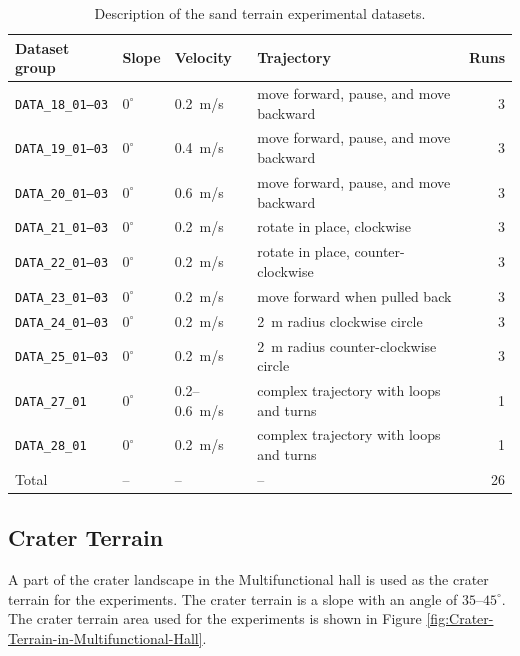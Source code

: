 \documentclass[report.tex]{subfiles}
\begin{document}
    \begin{table}[htbp]
        \centering
        \caption{Description of the sand terrain experimental datasets.}
        \label{tab:sand-terrain-experiments}
        \small
        \setlength{\tabcolsep}{3pt}
        \begin{tabular}{@{}p{}p{}p{}p{}r@{}}
            \toprule
            Dataset group & Slope & Velocity & Trajectory & Runs \\
            \midrule
            \texttt{DATA\_18\_01--03} & $0^\circ$ & 0.2~m/s & move forward, pause, and move backward & 3 \\
            \texttt{DATA\_19\_01--03} & $0^\circ$ & 0.4~m/s & move forward, pause, and move backward & 3 \\
            \texttt{DATA\_20\_01--03} & $0^\circ$ & 0.6~m/s & move forward, pause, and move backward & 3 \\
            \texttt{DATA\_21\_01--03} & $0^\circ$ & 0.2~m/s & rotate in place, clockwise & 3 \\
            \texttt{DATA\_22\_01--03} & $0^\circ$ & 0.2~m/s & rotate in place, counter-clockwise & 3 \\
            \texttt{DATA\_23\_01--03} & $0^\circ$ & 0.2~m/s & move forward when pulled back & 3 \\
            \texttt{DATA\_24\_01--03} & $0^\circ$ & 0.2~m/s & 2~m radius clockwise circle & 3 \\
            \texttt{DATA\_25\_01--03} & $0^\circ$ & 0.2~m/s & 2~m radius counter-clockwise circle & 3 \\
            \texttt{DATA\_27\_01} & $0^\circ$ & 0.2--0.6~m/s & complex trajectory with loops and turns & 1 \\
            \texttt{DATA\_28\_01} & $0^\circ$ & 0.2~m/s & complex trajectory with loops and turns & 1 \\
            \midrule
            Total & -- & -- & -- & 26 \\
            \bottomrule
        \end{tabular}
    \end{table}
        
    \subsection{Crater Terrain} \label{subsec:exp_craterTerrain}

    A part of the crater landscape in the Multifunctional hall is used as the crater terrain for the experiments. The crater terrain is a slope with an angle of $35$--$45^\circ$. The crater terrain area used for the experiments is shown in Figure \ref{fig:Crater-Terrain-in-Multifunctional-Hall}. 
    
\end{document}
